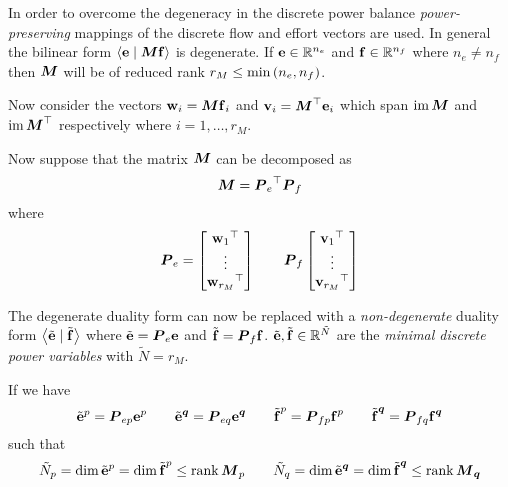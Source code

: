 In order to overcome the degeneracy in the discrete power balance
\emph{power-preserving} mappings of the discrete flow and effort vectors are
used. In general the bilinear form
$\dualityform{\dcovectr{e}}{\matr{M}\dcovectr{f}}{}$ is degenerate. If
$\dcovectr{e}\in\rntopology{n_{e}}$ and $\dcovectr{f}\in\rntopology{n_{f}}$
where $n_{e}\neq n_{f}$ then $\matr{M}$ will be of reduced rank $r_{M}\leq
\min \left( n_{e},n_{f} \right)$.

Now consider the vectors $\dcovectr{w}_{i}=\matr{M}\dcovectr{f}_{i}$ and
$\dcovectr{v}_{i}=\transpose{\matr{M}}\dcovectr{e}_{i}$ which span
$\image{\matr{M}}$ and $\image{\transpose{\matr{M}}}$ respectively where
$i=1,\ldots,r_{M}$.

Now suppose that the matrix $\matr{M}$ can be decomposed as
\begin{equation}
  \matr{M}=\transpose{\matr{P}_{e}}\matr{P}_{f}
\end{equation}
where
\begin{equation}
  \matr{P}_{e}=\begin{bmatrix}
  \transpose{\dcovectr{w}_{1}} \\
  \vdots \\
  \transpose{\dcovectr{w}_{r_{M}}}
  \end{bmatrix}\qquad\matr{P}_{f}\begin{bmatrix}
    \transpose{\dcovectr{v}_{1}} \\
    \vdots \\
    \transpose{\dcovectr{v}_{r_{M}}}
  \end{bmatrix}
\end{equation}
 
The degenerate duality form can now be replaced with a \emph{non-degenerate}
duality form $\dualityform{\tilde{\dcovectr{e}}}{\tilde{\dcovectr{f}}}{}$
where $\tilde{\dcovectr{e}}=\matr{P}_{e}\dcovectr{e}$ and
$\tilde{\dcovectr{f}}=\matr{P}_{f}\dcovectr{f}$. $\tilde{\dcovectr{e}},\tilde{\dcovectr{f}}\in\rntopology{\tilde{N}}$
are the \emph{minimal discrete power variables} with $\tilde{N}=r_{M}$.

If we have
\begin{equation}
  \tilde{\dcovectr{e}}^{p}=\matr{P}_{ep}\dcovectr{e}^{p}\qquad\tilde{\dcovectr{e}}^{\covectr{q}}=\matr{P}_{eq}\dcovectr{e}^{\covectr{q}}\qquad\tilde{\dcovectr{f}}^{p}=\matr{P}_{fp}\dcovectr{f}^{p}\qquad\tilde{\dcovectr{f}}^{\covectr{q}}=\matr{P}_{fq}\dcovectr{f}^{\covectr{q}}
\end{equation}
such that
\begin{equation}
  \tilde{N}_{p}=\dimension{\tilde{\dcovectr{e}}^{p}}=\dimension{\tilde{\dcovectr{f}}^{p}}\leq\rank{\matr{M}_{p}}\qquad
  \tilde{N}_{q}=\dimension{\tilde{\dcovectr{e}}^{\covectr{q}}}=\dimension{\tilde{\dcovectr{f}}^{\covectr{q}}}\leq\rank{\matr{M}_{\covectr{q}}}
\end{equation}

